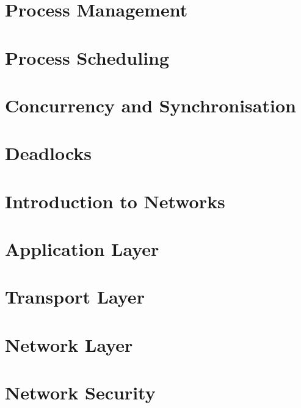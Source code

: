 \documentclass[
  11pt,
  a4paper,
]{article}
\begin{document}
\section{Process Management}


\section{Process Scheduling}



\section{Concurrency and Synchronisation}



\section{Deadlocks}


\section{Introduction to Networks}



\section{Application Layer}


\section{Transport Layer}


\section{Network Layer}



\section{Network Security}

\end{document}
